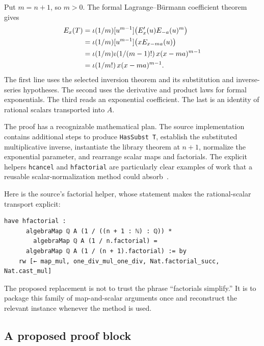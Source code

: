 \documentclass[11pt,a4paper]{article}
\newcommand{\code}[1]{\texttt{#1}}
\theoremstyle{remark}
\begin{document}
Put $m=n+1$, so $m>0$. The formal Lagrange--B\"urmann coefficient theorem gives
\begin{align}
[z^m]E_x(T)
&=\iota(1/m)[u^{m-1}]\bigl(E_x'(u)E_{-a}(u)^m\bigr)\notag\\
&=\iota(1/m)[u^{m-1}]\bigl(xE_{x-ma}(u)\bigr)\notag\\
&=\iota(1/m)\iota(1/(m-1)!)\,x(x-ma)^{m-1}\notag\\
&=\iota(1/m!)\,x(x-ma)^{m-1}.
\label{eq:abel-calculation}
\end{align}
The first line uses the selected inversion theorem and its substitution and inverse-series hypotheses. The second uses the derivative and product laws for formal exponentials. The third reads an exponential coefficient. The last is an identity of rational scalars transported into $A$.

The proof has a recognizable mathematical plan. The source implementation contains additional steps to produce \code{HasSubst T}, establish the substituted multiplicative inverse, instantiate the library theorem at $n+1$, normalize the exponential parameter, and rearrange scalar maps and factorials. The explicit helpers \code{hcancel} and \code{hfactorial} are particularly clear examples of work that a reusable scalar-normalization method could absorb~\cite{proveit-abel}.

Here is the source's factorial helper, whose statement makes the rational-scalar transport explicit:
\begin{lstlisting}[caption={An actual excerpt from the Abel coefficient proof~\cite{proveit-abel}.}]
  have hfactorial :
      algebraMap ℚ A (1 / ((n + 1 : ℕ) : ℚ)) *
        algebraMap ℚ A (1 / n.factorial) =
      algebraMap ℚ A (1 / (n + 1).factorial) := by
    rw [← map_mul, one_div_mul_one_div, Nat.factorial_succ, Nat.cast_mul]
\end{lstlisting}
The proposed replacement is not to trust the phrase ``factorials simplify.'' It is to package this family of map-and-scalar arguments once and reconstruct the relevant instance whenever the method is used.

\subsection{A proposed proof block}
\end{document}
